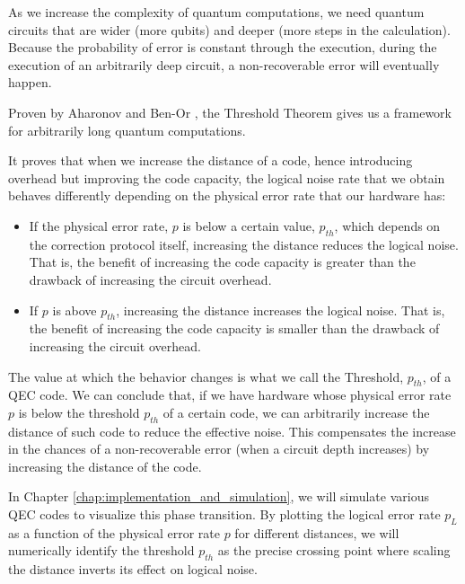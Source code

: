 As we increase the complexity of quantum computations, we need quantum circuits that are wider (more qubits) and deeper (more steps in the calculation). Because the probability of error is constant through the execution, during the execution of an arbitrarily deep circuit, a non-recoverable error will eventually happen. 

Proven by Aharonov and Ben-Or \cite{aharonov1997fault}, the Threshold Theorem gives us a framework for arbitrarily long quantum computations. 

It proves that when we increase the distance of a code, hence introducing overhead but improving the code capacity, the logical noise rate that we obtain behaves differently depending on the physical error rate that our hardware has:

\begin{itemize}
    \item If the physical error rate, $p$ is below a certain value, $p_{th}$, which depends on the correction protocol itself, increasing the distance reduces the logical noise. That is, the benefit of increasing the code capacity is greater than the drawback of increasing the circuit overhead.
    \item If $p$ is above $p_{th}$, increasing the distance increases the logical noise. That is, the benefit of increasing the code capacity is smaller than the drawback of increasing the circuit overhead.
\end{itemize}

The value at which the behavior changes is what we call the Threshold, $p_{th}$, of a QEC code. We can conclude that, if we have hardware whose physical error rate $p$ is below the threshold $p_{th}$ of a certain code, we can arbitrarily increase the distance of such code to reduce the effective noise. This compensates the increase in the chances of a non-recoverable error (when a circuit depth increases) by increasing the distance of the code.

In Chapter \ref{chap:implementation_and_simulation}, we will simulate various QEC codes to visualize this phase transition. By plotting the logical error rate $p_L$ as a function of the physical error rate $p$ for different distances, we will numerically identify the threshold $p_{th}$ as the precise crossing point where scaling the distance inverts its effect on logical noise.